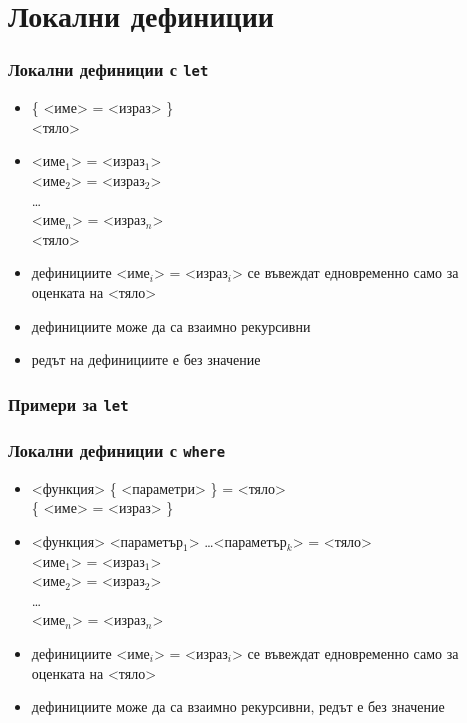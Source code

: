 \documentclass{beamer}
\begin{document}
\section{Локални дефиниции}

\begin{frame}
  \frametitle{Локални дефиниции с \tt{let}}
  \begin{itemize}
  \item {} \{ <име> \tta= <израз> \}\\
     <тяло>
    \pause
  \item {} <име$_1$> \tta= <израз$_1$>\\
    \hspace{5ex}<име$_2$> \tta= <израз$_2$>\\
    \hspace{5ex}\ldots\\
    \hspace{5ex}<име$_n$> \tta= <израз$_n$>\\
     <тяло>
    \pause
  \item дефинициите <име$_i$> = <израз$_i$> се въвеждат едновременно само за оценката на <тяло>
  \item дефинициите може да са взаимно рекурсивни
  \item редът на дефинициите е без значение
  \end{itemize}
\end{frame}

\begin{frame}
  \frametitle{Примери за \tt{let}}
  
  \begin{itemize}
  \item \evalsto{
  \end{itemize}
\end{frame}

\begin{frame}
  \frametitle{Локални дефиниции с \tt{where}}
  \begin{itemize}
  \item{} <функция> \{ <параметри> \} = <тяло>\\
        \hspace{5ex}  \{ <име> \tta= <израз> \}
        \pause
  \item{} <функция> <параметър$_1$> \ldots <параметър$_k$> = <тяло>\\
        \hspace{5ex}  <име$_1$> \tta= <израз$_1$>\\
        \hspace{11ex} <име$_2$> \tta= <израз$_2$>\\
        \hspace{11ex}\ldots\\
        \hspace{11ex} <име$_n$> \tta= <израз$_n$>\\
        \pause
  \item дефинициите <име$_i$> = <израз$_i$> се въвеждат едновременно само за оценката на <тяло>
  \item дефинициите може да са взаимно рекурсивни, редът е без значение
  \end{itemize}
\end{frame}
\end{document}
